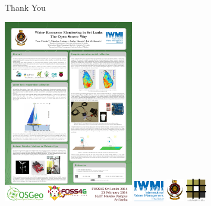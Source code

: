 \documentclass[xcolor=dvipsnames,beamer]{beamer} %
\begin{document}
\begin{frame}[fragile]{Thank You}

\begin{flushright}
 \includegraphics[height=8cm]{poster}
\vspace{15mm}
 \includegraphics[height=0.9cm]{iwmi}
 \vspace{5mm}
 \includegraphics[height=1cm]{uoMoratuwa}
 \vspace{5mm}
 \includegraphics[height=1cm]{uoMoratuwa_foa}
\end{flushright}

\end{frame}
\end{document}
